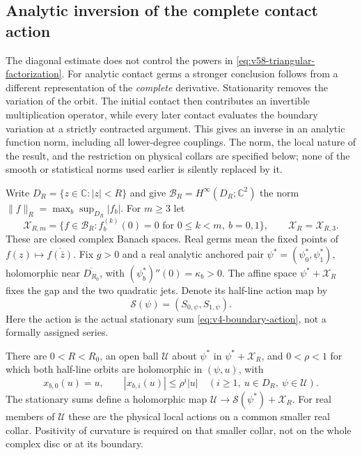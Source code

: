 \subsection{Analytic inversion of the complete contact action}
\label{subsec:v59-analytic-inverse}

The diagonal estimate does not control the powers in
\eqref{eq:v58-triangular-factorization}.  For analytic contact germs a
stronger conclusion follows from a different representation of the
\emph{complete} derivative.  Stationarity removes the variation of the
orbit.  The initial contact then contributes an invertible multiplication
operator, while every later contact evaluates the boundary variation at a
strictly contracted argument.  This gives an inverse in an analytic
function norm, including all lower-degree couplings.  The norm, the local
nature of the result, and the restriction on physical collars are specified
below; none of the smooth or statistical norms used earlier is silently
replaced by it.

Write $D_R=\{z\in\mathbb C:|z|<R\}$ and give
$\mathscr B_R=H^\infty(D_R;\mathbb C^2)$ the norm
$\|f\|_R=\max_b\sup_{D_R}|f_b|$.  For $m\ge3$ let
\begin{equation}\label{eq:v59-analytic-spaces}
 \mathscr X_{R,m}=\{f\in\mathscr B_R:f_b^{(k)}(0)=0
                  \text{ for }0\le k<m,\ b=0,1\},
 \qquad \mathscr X_R=\mathscr X_{R,3}.
\end{equation}
These are closed complex Banach spaces.  Real germs mean the fixed points
of $f(z)\mapsto\overline{f(\bar z)}$.  Fix $g>0$ and a real analytic
anchored pair $\psi^*=(\psi_0^*,\psi_1^*)$, holomorphic near
$\overline{D_{R_0}}$, with $(\psi_b^*)''(0)=\kappa_b>0$.
The affine space $\psi^*+\mathscr X_R$ fixes the gap and the two quadratic
jets.  Denote its half-line action map by
\[
                 \mathscr S(\psi)=(S_{0,\psi},S_{1,\psi}).
\]
Here the action is the actual stationary sum
\eqref{eq:v4-boundary-action}, not a formally assigned series.

\begin{lemma}
\label{lem:v59-holomorphic-halfline}
There are $0<R<R_0$, an open ball $\mathscr U$ about $\psi^*$ in
$\psi^*+\mathscr X_R$, and $0<\rho<1$ for which both half-line orbits
are holomorphic in $(\psi,u)$, with
\begin{equation}\label{eq:v59-disc-contraction}
 x_{b,0}(u)=u,\qquad |x_{b,i}(u)|\le\rho^i|u|\quad(i\ge1,
                         \ u\in D_R,\ \psi\in\mathscr U).
\end{equation}
The stationary sums define a holomorphic map
$\mathscr U\to\mathscr S(\psi^*)+\mathscr X_R$.  For real members
of $\mathscr U$ these are the physical local actions on a common smaller
real collar.  Positivity of curvature is required on that smaller collar,
not on the whole complex disc or at its boundary.
\end{lemma}

